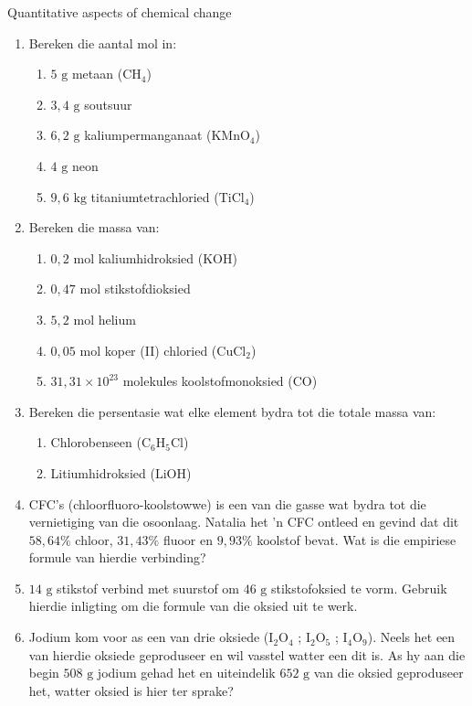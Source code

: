 \begin{eocexercises}{Quantitative aspects of chemical change}
\begin{enumerate}[noitemsep, label=\textbf{\arabic*}. ]
\item Bereken die aantal mol in:
 \begin{enumerate}[noitemsep, label=\textbf{\alph*}. ] 
 \item $5 \text{ g}$ metaan (${\text{CH}}_{4}$)
 \item $3,4 \text{ g}$ soutsuur
\item $6,2 \text{ g}$ kaliumpermanganaat (${\text{KMnO}}_{4}$)
 \item $4 \text{ g}$ neon
 \item $9,6 \text{ kg}$ titaniumtetrachloried (${\text{TiCl}}_{4}$)
 \end{enumerate}
\item Bereken die massa van:
 \begin{enumerate}[noitemsep, label=\textbf{\alph*}. ] 
 \item $0,2 \text{ mol}$ kaliumhidroksied ($\text{KOH}$)
 \item $0,47 \text{ mol}$ stikstofdioksied
 \item $5,2 \text{ mol}$ helium
 \item $0,05 \text{ mol}$ koper (II) chloried (${\text{CuCl}}_{2}$)
 \item $31,31 \times {10}^{23}$ molekules koolstofmonoksied ($\text{CO}$)\end{enumerate}
\item Bereken die persentasie wat elke element bydra tot die totale massa van:
 \begin{enumerate}[noitemsep, label=\textbf{\alph*}. ] 
 \item Chlorobenseen (${\text{C}}_{6}{\text{H}}_{5}\text{Cl}$)
 \item Litiumhidroksied ($\text{LiOH}$)
 \end{enumerate}
\item CFC's (chloorfluoro-koolstowwe) is een van die gasse wat bydra tot die vernietiging van die osoonlaag. Natalia het  'n CFC ontleed en gevind dat dit $58,64\%$ chloor, $31,43\%$ fluoor en $9,93\%$ koolstof bevat. Wat is die empiriese formule van hierdie verbinding?
\item $14 \text{ g}$ stikstof verbind met suurstof om $46 \text{ g}$ stikstofoksied te vorm. Gebruik hierdie inligting om die formule van die oksied uit te werk.
\item Jodium kom voor as een van drie oksiede (${\text{I}}_{2}{\text{O}}_{4}$ ; ${\text{I}}_{2}{\text{O}}_{5}$ ; ${\text{I}}_{4}{\text{O}}_{9}$). Neels het een van hierdie oksiede geproduseer en wil vasstel watter een dit is. As hy aan die begin $508 \text{ g}$ jodium gehad het en uiteindelik $652 \text{ g}$ van die oksied geproduseer het, watter oksied is hier ter sprake?

\end{enumerate}
\end{eocexercises}
